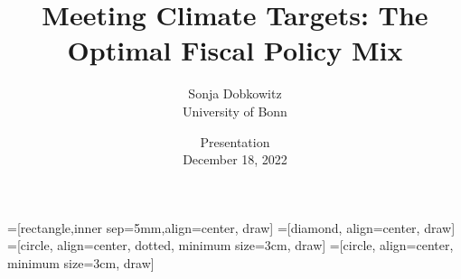 \documentclass[11pt,aspectratio=169]{beamer}
\author[Sonja Dobkowitz]{\small Sonja Dobkowitz\\ \footnotesize{University of Bonn%
}\\ }
\title{Meeting Climate Targets: The Optimal Fiscal Policy Mix}
\date{\small{ Presentation\\ December 18, 2022 }}
\begin{document}
=[rectangle,inner sep=5mm,align=center, draw]
=[diamond, align=center, draw]
=[circle, align=center, dotted, minimum size=3cm, draw]
=[circle, align=center, minimum size=3cm, draw]
{
	\begin{frame}
		\titlepage
	\end{frame}
}




%	
\end{document}
